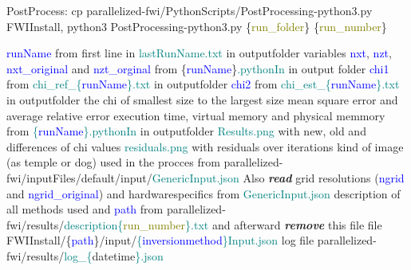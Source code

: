 \documentclass{article}
\begin{document}
\begin{algorithm}
\caption{PostProcess: cp  parallelized-fwi/PythonScripts/PostProcessing-python3.py FWIInstall, python3 PostProcessing-python3.py \{\textcolor{olive}{run\_folder}\} \{\textcolor{olive}{run\_number}\}}
\begin{algorithmic}
 \textcolor{blue}{runName} from first line in \textcolor{teal}{lastRunName.txt} in outputfolder
 variables \textcolor{blue}{nxt}, \textcolor{blue}{nzt}, \textcolor{blue}{nxt\_original} and \textcolor{blue}{nzt\_orginal} from \{\textcolor{blue}{runName}\}\textcolor{teal}{.pythonIn} in output folder
 \textcolor{blue}{chi1} from \textcolor{teal}{chi\_ref\_\{}\textcolor{blue}{runName}\textcolor{teal}{\}.txt} in outputfolder
 \textcolor{blue}{chi2} from \textcolor{teal}{chi\_est\_\{}\textcolor{blue}{runName}\textcolor{teal}{\}.txt} in outputfolder
 the chi of smallest size to the largest size
 mean square error and average relative error
 execution time, virtual memory and physical memmory from \textcolor{teal}{\{}\textcolor{blue}{runName}\textcolor{teal}{\}.pythonIn} in outputfolder
 \textcolor{teal}{Results.png} with new, old and differences of chi values
 \textcolor{teal}{residuals.png} with residuals over iterations
 
 { }
 kind of image (as temple or dog) used in the procces \State from parallelized-fwi/inputFiles/default/input/\textcolor{teal}{GenericInput.json}
\State Also {\bf \emph {read}} grid resolutions (\textcolor{blue}{ngrid} and \textcolor{blue}{ngrid\_original}) and hardwarespecifics from \textcolor{teal}{GenericInput.json}
 description of all methods used and \textcolor{blue}{path} from parallelized-fwi/results/\textcolor{teal}{description\{}\textcolor{olive}{run\_number}\textcolor{teal}{\}.txt} \State and afterward {\bf \emph {remove}} this file
 file FWIInstall/\{\textcolor{blue}{path}\}/input/\textcolor{teal}{\{}\textcolor{blue}{inversionmethod}\textcolor{teal}{\}Input.json}
\EndProcedure
{} { }
\EndIf
{} log file parallelized-fwi/results/\textcolor{teal}{log\_\{}datetime\textcolor{teal}{\}.json}
\EndProcedure
\EndProcedure
\end{algorithmic}
\end{algorithm}
\end{document}
